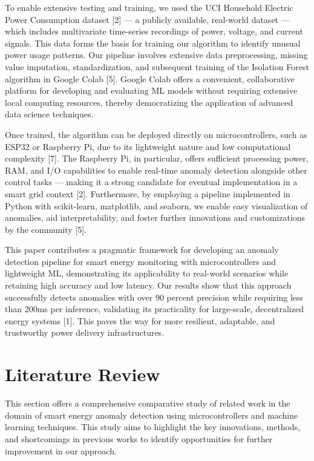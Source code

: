 \documentclass[12pt, draftclsnofoot, onecolumn]{IEEEtran}
\begin{document}
To enable extensive testing and training, we used the UCI Household Electric Power Consumption dataset [2] — a publicly available, real-world dataset — which includes multivariate time-series recordings of power, voltage, and current signals. This data forms the basis for training our algorithm to identify unusual power usage patterns. Our pipeline involves extensive data preprocessing, missing value imputation, standardization, and subsequent training of the Isolation Forest algorithm in Google Colab [5]. Google Colab offers a convenient, collaborative platform for developing and evaluating ML models without requiring extensive local computing resources, thereby democratizing the application of advanced data science techniques.

Once trained, the algorithm can be deployed directly on microcontrollers, such as ESP32 or Raspberry Pi, due to its lightweight nature and low computational complexity [7]. The Raspberry Pi, in particular, offers sufficient processing power, RAM, and I/O capabilities to enable real-time anomaly detection alongside other control tasks — making it a strong candidate for eventual implementation in a smart grid context [2]. Furthermore, by employing a pipeline implemented in Python with scikit-learn, matplotlib, and seaborn, we enable easy visualization of anomalies, aid interpretability, and foster further innovations and customizations by the community [5].

This paper contributes a pragmatic framework for developing an anomaly detection pipeline for smart energy monitoring with microcontrollers and lightweight ML, demonstrating its applicability to real-world scenarios while retaining high accuracy and low latency. Our results show that this approach successfully detects anomalies with over 90 percent precision while requiring less than 200ms per inference, validating its practicality for large-scale, decentralized energy systems [1]. This paves the way for more resilient, adaptable, and trustworthy power delivery infrastructures.

\section{Literature Review}

This section offers a comprehensive comparative study of related work in the domain of smart energy anomaly detection using microcontrollers and machine learning techniques. This study aims to highlight the key innovations, methods, and shortcomings in previous works to identify opportunities for further improvement in our approach.
\end{document}
